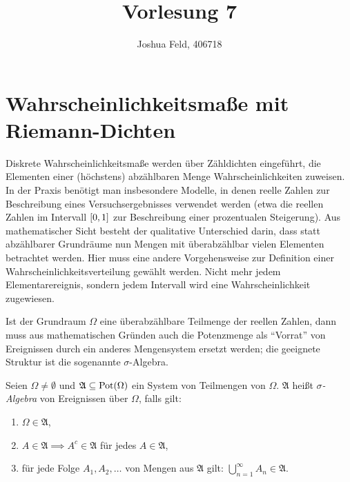 \documentclass{lecture}
\institute{Institut für Statistik und Wirtschaftsmathematik}
\title{Vorlesung 7}
\author{Joshua Feld, 406718}
\begin{document}
    \maketitle


    \section*{Wahrscheinlichkeitsmaße mit Riemann-Dichten}

    Diskrete Wahrscheinlichkeitsmaße werden über Zähldichten eingeführt, die Elementen einer (höchstens) abzählbaren Menge Wahrscheinlichkeiten zuweisen.
    In der Praxis benötigt man insbesondere Modelle, in denen reelle Zahlen zur Beschreibung eines Versuchsergebnisses verwendet werden (etwa die reellen Zahlen im Intervall \(\brackets*{0, 1}\) zur Beschreibung einer prozentualen Steigerung).
    Aus mathematischer Sicht besteht der qualitative Unterschied darin, dass statt abzählbarer Grundräume nun Mengen mit überabzählbar vielen Elementen betrachtet werden.
    Hier muss eine andere Vorgehensweise zur Definition einer Wahrscheinlichkeitsverteilung gewählt werden.
    Nicht mehr jedem Elementarereignis, sondern jedem Intervall wird eine Wahrscheinlichkeit zugewiesen.

    Ist der Grundraum \(\Omega\) eine überabzählbare Teilmenge der reellen Zahlen, dann muss aus mathematischen Gründen auch die Potenzmenge als ``Vorrat'' von Ereignissen durch ein anderes Mengensystem ersetzt werden; die geeignete Struktur ist die sogenannte \(\sigma\)-Algebra.

    \begin{definition}
        Seien \(\Omega \ne \emptyset\) und \(\mathfrak{A} \subseteq \Pot\parentheses*{\Omega}\) ein System von Teilmengen von \(\Omega\).
        \(\mathfrak{A}\) heißt \emph{\(\sigma\)-Algebra} von Ereignissen über \(\Omega\), falls gilt:
        \begin{enumerate}
            \item \(\Omega \in \mathfrak{A}\),
            \item \(A \in \mathfrak{A} \implies A^c \in \mathfrak{A}\) für jedes \(A \in \mathfrak{A}\),
            \item für jede Folge \(A_1, A_2, \ldots\) von Mengen aus \(\mathfrak{A}\) gilt: \(\bigcup_{n = 1}^\infty A_n \in \mathfrak{A}\).
        \end{enumerate}
    \end{definition}
\end{document}
